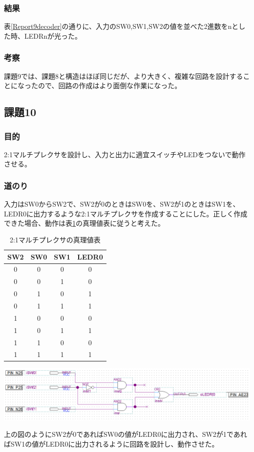 \documentclass[a4paper]{jarticle}
\begin{document}
\subsubsection{結果}
表\ref{Report9decoder}の通りに、入力のSW0,SW1,SW2の値を並べた2進数をnとした時、LEDRnが光った。
\subsubsection{考察}
課題9では、課題8と構造はほぼ同じだが、より大きく、複雑な回路を設計することになったので、回路の作成はより面倒な作業になった。
\subsection{課題10}
\subsubsection{目的}
2:1マルチプレクサを設計し、入力と出力に適宜スイッチやLEDをつないで動作させる。
\subsubsection{道のり}
入力はSW0からSW2で、SW2が0のときはSW0を、SW2が1のときはSW1を、LEDR0に出力するような2:1マルチプレクサを作成することにした。正しく作成できた場合、動作は表\ref{Report10Multiplexer}の真理値表に従うと考えた。
\begin{table}[ht]
	\begin{center}
		\caption{2:1マルチプレクサの真理値表}
		\label{Report10Multiplexer}
		\begin{tabular}{|c|c|c|c|}			\hline
			SW2	&SW0	&SW1	&LEDR0\\	\hline\hline
			0	&0	&0	&0\\		\hline
			0	&0	&1	&0\\		\hline
			0	&1	&0	&1\\		\hline
			0	&1	&1	&1\\		\hline
			1	&0	&0	&0\\		\hline
			1	&0	&1	&1\\		\hline
			1	&1	&0	&0\\		\hline
			1	&1	&1	&1\\		\hline
		\end{tabular}
	\end{center}
\end{table}
\begin{center}
	\includegraphics[width=15cm]{work10.PNG}
\end{center}
上の図のようにSW2が0であればSW0の値がLEDR0に出力され、SW2が1であればSW1の値がLEDR0に出力されるように回路を設計し、動作させた。
\end{document}
